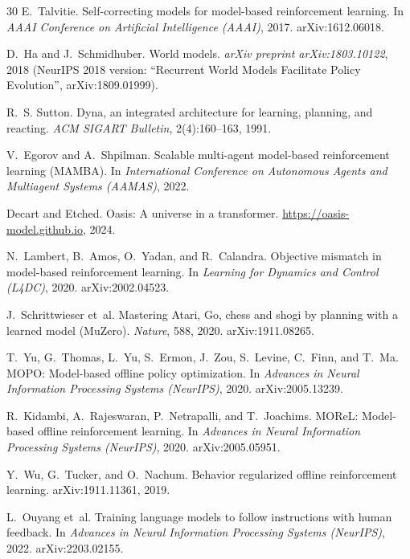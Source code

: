 \documentclass[11pt]{article}
\begin{document}
\begin{thebibliography}{30}
E.~Talvitie.
\newblock Self-correcting models for model-based reinforcement learning.
\newblock In \emph{AAAI Conference on Artificial Intelligence (AAAI)}, 2017. arXiv:1612.06018.

D.~Ha and J.~Schmidhuber.
\newblock World models.
\newblock \emph{arXiv preprint arXiv:1803.10122}, 2018 (NeurIPS 2018 version: ``Recurrent World Models Facilitate Policy Evolution'', arXiv:1809.01999).

R.~S. Sutton.
\newblock Dyna, an integrated architecture for learning, planning, and reacting.
\newblock \emph{ACM SIGART Bulletin}, 2(4):160--163, 1991.

V.~Egorov and A.~Shpilman.
\newblock Scalable multi-agent model-based reinforcement learning (MAMBA).
\newblock In \emph{International Conference on Autonomous Agents and Multiagent Systems (AAMAS)}, 2022.

Decart and Etched.
\newblock Oasis: A universe in a transformer.
\newblock \url{https://oasis-model.github.io}, 2024.

N.~Lambert, B.~Amos, O.~Yadan, and R.~Calandra.
\newblock Objective mismatch in model-based reinforcement learning.
\newblock In \emph{Learning for Dynamics and Control (L4DC)}, 2020. arXiv:2002.04523.

J.~Schrittwieser et~al.
\newblock Mastering Atari, Go, chess and shogi by planning with a learned model (MuZero).
\newblock \emph{Nature}, 588, 2020. arXiv:1911.08265.

T.~Yu, G.~Thomas, L.~Yu, S.~Ermon, J.~Zou, S.~Levine, C.~Finn, and T.~Ma.
\newblock MOPO: Model-based offline policy optimization.
\newblock In \emph{Advances in Neural Information Processing Systems (NeurIPS)}, 2020. arXiv:2005.13239.

R.~Kidambi, A.~Rajeswaran, P.~Netrapalli, and T.~Joachims.
\newblock MOReL: Model-based offline reinforcement learning.
\newblock In \emph{Advances in Neural Information Processing Systems (NeurIPS)}, 2020. arXiv:2005.05951.

Y.~Wu, G.~Tucker, and O.~Nachum.
\newblock Behavior regularized offline reinforcement learning.
\newblock arXiv:1911.11361, 2019.

L.~Ouyang et~al.
\newblock Training language models to follow instructions with human feedback.
\newblock In \emph{Advances in Neural Information Processing Systems (NeurIPS)}, 2022. arXiv:2203.02155.


\end{thebibliography}
\end{document}
